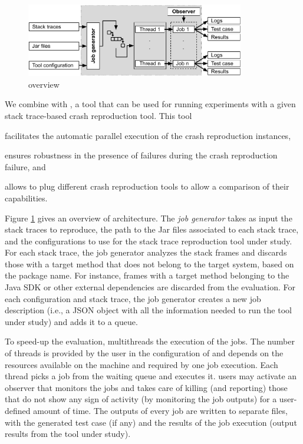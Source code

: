 
\begin{figure}[t]
\centering
\includegraphics[width=0.85\textwidth]{papers/jcrashpack/crashpack-Scheduler}
\caption{\exrunner overview}
\label{fig:exrunner}
\end{figure}

We combine \crashpack with \exrunner, a tool that can be used for running experiments with a given stack trace-based crash reproduction tool. This tool
\begin{inparaenum}[(i)]
\item facilitates the automatic parallel execution of the crash reproduction instances, 
\item ensures robustness in the presence of failures during the crash reproduction failure, and
\item allows to plug different crash reproduction tools to allow a comparison of their capabilities.
\end{inparaenum}

Figure \ref{fig:exrunner} gives an overview of \exrunner architecture.
The \emph{job generator} takes as input the stack traces to reproduce, the path to the Jar files associated to each stack trace, and the configurations to use for the stack trace reproduction tool under study. 
%
For each stack trace, the job generator analyzes the stack frames and discards those with a target method that does not belong to the target system, based on the package name. 
For instance, frames with a target method belonging to the Java SDK or other external dependencies are discarded from the evaluation.
For each configuration and stack trace, the job generator creates a new job description (i.e., a JSON object with all the information needed to run the tool under study) and adds it to a queue. 

To speed-up the evaluation, \exrunner multithreads the execution of the jobs.
The number of threads is provided by the user in the configuration of \exrunner and depends on the resources available on the machine and required by one job execution.
Each thread picks a job from the waiting queue and executes it. 
\exrunner users may activate an observer that monitors the jobs and takes care of killing (and reporting) those that do not show any sign of activity (by monitoring the job outputs) for a user-defined amount of time.
The outputs of every job are written to separate files, with the generated test case (if any) and the results of the job execution (output results from the tool under study).

